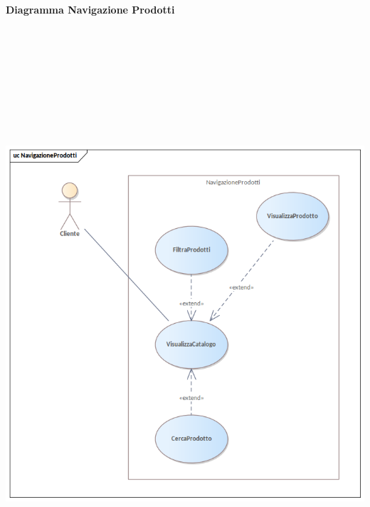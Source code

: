 \newpage\paragraph{Diagramma Navigazione Prodotti}\mbox{}\\
\begin{center}
  \includegraphics[width=\textwidth, height=20cm, keepaspectratio]{immagini/GestioneDeiRequisiti/NavigazioneProdotti.png}
\end{center}

\newpage
